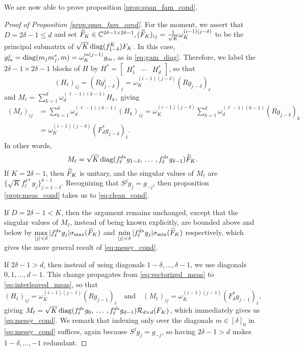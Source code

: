 We are now able to prove proposition \ref{prop:span_fam_cond}.

\begin{proof}[Proof of Proposition \ref{prop:span_fam_cond}]
  For the moment, we assert that $D = 2 \delta - 1 \le d$ and set $\widetilde{F}_K \in \mathbb{C}^{2 \delta - 1 \times 2 \delta - 1}, (\widetilde{F}_K)_{ij} = \frac{1}{\sqrt{K}}\omega_K^{(i-1)(j-\delta)}$ to be the principal submatrix of $\sqrt{K} \operatorname{diag}(f^K_{1 - \delta}) F_K$.  In this case, $g_m^j = \operatorname{diag}(m_j m_j^*, m) = \omega_K^{m(j - 1)} g_m$, as in \eqref{eq:gam_diag}.  Therefore, we label the $2 \delta - 1 \times 2 \delta - 1$ blocks of $H$ by $H^* = \begin{bmatrix} H_1^* & \cdots & H_d^* \end{bmatrix}$, so that \[(H_\ell)_{ij} = (R g_{j - \delta}^i)_\ell = \omega_K^{(i - 1)(j - \delta)}(R g_{j - \delta})_\ell\] and $M_\ell = \sum_{k = 1}^d \omega_d^{(\ell - 1)(k - 1)} H_k,$ giving \begin{align*} (M_\ell)_{ij} &= \sum_{k = 1}^d \omega_d^{(\ell - 1)(k - 1)} (H_k)_{ij} = \omega_K^{(i - 1)(j - \delta)} \sum_{k = 1}^d \omega_d^{(\ell - 1)(k - 1)} (Rg_{j - \delta})_k \\ &= \omega_K^{(i - 1)(j - \delta)} (F_d^* g_{j - \delta})_\ell. \end{align*}  In other words, \begin{equation} M_\ell = \sqrt{K} \diag(f_\ell^{d*} g_{1 - \delta},\, \ldots\, , f_\ell^{d*} g_{\delta - 1}) %
    \tF_K. \label{eq:block_diag_components} \end{equation}  If $K = 2 \delta - 1$, then $\widetilde{F}_K$ is unitary, and the singular values of $M_\ell$ are $\{\sqrt{K} f_\ell^{d *} g_j\}_{j = 1 - \delta}^{\delta - 1}$.  Recognizing that $S^j g_j = g_{-j}$, then proposition \ref{prop:meas_cond} takes us to \eqref{eq:clean_cond}.

  If $D = 2 \delta - 1 < K$, then the argument remains unchanged, except that the singular values of $M_\ell$, instead of being known explicitly, are bounded above and below by $\max\limits_{|j| < \delta} |f_\ell^{d *} g_j| \sigma_{\max}(\widetilde{F}_K)$ and $\min\limits_{|j| < \delta} |f_\ell^{d *} g_j| \sigma_{\min}(\widetilde{F}_K)$ respectively, which gives the more general result of \eqref{eq:messy_cond}.

  If $2 \delta - 1 > d$, then instead of using diagonals $1 - \delta, \ldots, \delta - 1$, we use diagonals $0, 1, \ldots, d - 1$.  This change propagates from \eqref{eq:vectorized_meas} to \eqref{eq:interleaved_meas}, so that \[(H_\ell)_{ij} = \omega_K^{(i - 1)(j - 1)} (R g_{j - 1})_\ell \quad \text{and} \quad (M_\ell)_{ij} = \omega_K^{(i - 1)(j - 1)} (F_d^* g_{j - 1})_\ell,\] giving $M_\ell = \sqrt{K} \operatorname{diag}(f_\ell^{d*} g_0,\, \ldots\, , f_\ell^{d*} g_{d - 1})\mathcal{R}_{d \times d}(F_K)$, which immediately gives us \eqref{eq:messy_cond}.  We remark that indexing only over the diagonals $m \in [\delta]_0$ in \eqref{eq:messy_cond} suffices, again because $S^j g_j = g_{-j}$, so having $2 \delta - 1 > d$ makes $1 - \delta, \ldots, -1$ redundant.
  
\end{proof}
